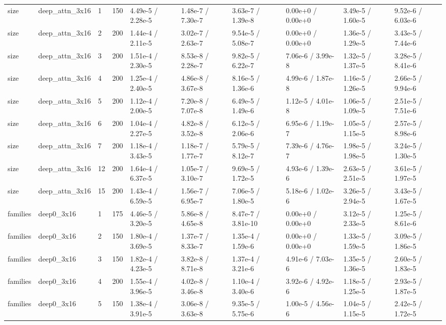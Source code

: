 \documentclass[10pt,a4paper]{article}
\begin{document}
\begin{landscape}
\begin{scriptsize}
\begin{longtable}{llllllllll}
size & deep\_attn\_3x16 & 1 & 150 & 4.49e-5 / 2.28e-5 & 1.48e-7 / 7.30e-7 & 3.63e-7 / 1.39e-8 & 0.00e+0 / 0.00e+0 & 3.49e-5 / 1.60e-5 & 9.52e-6 / 6.03e-6 \\
size & deep\_attn\_3x16 & 2 & 200 & 1.44e-4 / 2.11e-5 & 3.02e-7 / 2.63e-7 & 9.54e-5 / 5.08e-7 & 0.00e+0 / 0.00e+0 & 1.36e-5 / 1.29e-5 & 3.43e-5 / 7.44e-6 \\
size & deep\_attn\_3x16 & 3 & 200 & 1.51e-4 / 2.30e-5 & 8.53e-8 / 2.28e-7 & 9.82e-5 / 6.22e-7 & 7.06e-6 / 3.99e-8 & 1.32e-5 / 1.37e-5 & 3.28e-5 / 8.41e-6 \\
size & deep\_attn\_3x16 & 4 & 200 & 1.25e-4 / 2.40e-5 & 4.86e-8 / 3.67e-8 & 8.16e-5 / 1.36e-6 & 4.99e-6 / 1.87e-8 & 1.16e-5 / 1.26e-5 & 2.66e-5 / 9.94e-6 \\
size & deep\_attn\_3x16 & 5 & 200 & 1.12e-4 / 2.00e-5 & 7.20e-8 / 7.07e-8 & 6.49e-5 / 1.49e-6 & 1.12e-5 / 4.01e-8 & 1.06e-5 / 1.09e-5 & 2.51e-5 / 7.51e-6 \\
size & deep\_attn\_3x16 & 6 & 200 & 1.04e-4 / 2.27e-5 & 4.82e-8 / 3.52e-8 & 6.12e-5 / 2.06e-6 & 6.95e-6 / 1.19e-7 & 1.05e-5 / 1.15e-5 & 2.57e-5 / 8.98e-6 \\
size & deep\_attn\_3x16 & 7 & 200 & 1.18e-4 / 3.43e-5 & 1.18e-7 / 1.77e-7 & 5.79e-5 / 8.12e-7 & 7.39e-6 / 4.76e-7 & 1.98e-5 / 1.98e-5 & 3.24e-5 / 1.30e-5 \\
size & deep\_attn\_3x16 & 12 & 200 & 1.64e-4 / 6.37e-5 & 1.05e-7 / 3.10e-7 & 9.69e-5 / 1.72e-5 & 4.93e-6 / 1.39e-6 & 2.63e-5 / 2.51e-5 & 3.61e-5 / 1.97e-5 \\
size & deep\_attn\_3x16 & 15 & 200 & 1.43e-4 / 6.59e-5 & 1.56e-7 / 6.95e-7 & 7.06e-5 / 1.80e-5 & 5.18e-6 / 1.02e-6 & 3.26e-5 / 2.94e-5 & 3.43e-5 / 1.67e-5 \\
families & deep0\_3x16 & 1 & 175 & 4.46e-5 / 3.20e-5 & 5.86e-8 / 4.65e-8 & 8.47e-7 / 3.81e-10 & 0.00e+0 / 0.00e+0 & 3.12e-5 / 2.33e-5 & 1.25e-5 / 8.61e-6 \\
families & deep0\_3x16 & 2 & 150 & 1.80e-4 / 3.69e-5 & 1.37e-7 / 8.33e-7 & 1.35e-4 / 1.59e-6 & 0.00e+0 / 0.00e+0 & 1.33e-5 / 1.59e-5 & 3.09e-5 / 1.86e-5 \\
families & deep0\_3x16 & 3 & 150 & 1.82e-4 / 4.23e-5 & 3.82e-8 / 8.71e-8 & 1.37e-4 / 3.21e-6 & 4.91e-6 / 7.03e-6 & 1.35e-5 / 1.36e-5 & 2.60e-5 / 1.83e-5 \\
families & deep0\_3x16 & 4 & 200 & 1.55e-4 / 3.96e-5 & 4.02e-8 / 3.46e-8 & 1.10e-4 / 3.40e-6 & 3.92e-6 / 4.92e-6 & 1.18e-5 / 1.25e-5 & 2.93e-5 / 1.87e-5 \\
families & deep0\_3x16 & 5 & 150 & 1.38e-4 / 3.91e-5 & 3.06e-8 / 3.63e-8 & 9.35e-5 / 5.75e-6 & 1.00e-5 / 4.56e-6 & 1.04e-5 / 1.15e-5 & 2.42e-5 / 1.72e-5 \\

\end{longtable}
\end{scriptsize}
\end{landscape}
\end{document}
